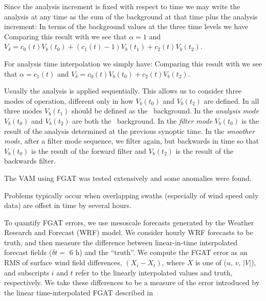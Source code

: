 \documentclass[12pt,titlepage]{article}
\begin{document}

Since the analysis increment is fixed with respect to time we may
write the analysis at any time as the sum of the background at that
time plus the analysis increment:
In terms of the background values at the three time levels we have
Comparing this result with  we see that $\alpha = 1$ and
$V_{\delta} = c_0(t) V_b(t_0) + (c_1(t) - 1) V_b(t_1) + c_2(t)
V_b(t_2)$.


For analysis time interpolation we simply have:
Comparing this result with  we see that $\alpha = c_1(t)$
and $V_{\delta} = c_0(t) V_b(t_0) + c_2(t) V_b(t_2)$.


Usually the analysis is applied sequentially.
This allows us to consider three modes of operation, different only
in how $V_b(t_0)$ and $V_b(t_2)$ are defined.
In all three modes $V_b(t_1)$ should be defined as the \apriori\
background.
In the \emph{analysis mode} $V_b(t_0)$ and $V_b(t_2)$ are both the
\apriori\ background.
In the \emph{filter mode} $V_b(t_0)$ is the result of the analysis
determined at the previous synoptic time.
In the \emph{smoother mode}, after a filter mode sequence, we filter
again, but backwards in time so that $V_b(t_0)$ is the result of the
forward filter and $V_b(t_2)$ is the result of the backwards filter.


The VAM using FGAT was tested extensively and some anomalies were
found.

Problems typically occur when overlapping swaths (especially of wind
speed only data) are offset in time by several hours.


To quantify FGAT errors, we use mesoscale forecasts generated by the
Weather Research and Forecast (WRF) model.
 We consider hourly WRF forecasts to be truth, and then measure
the difference between linear-in-time interpolated forecast fields
($\delta t =$ 6 h) and the ``truth''.
 We compute the FGAT error as an RMS of surface wind field
differences, $(X_i - X_t)$, where $X$ is one of ($u$, $v$, $|V|$),
and subscripts $i$ and $t$ refer to the linearly interpolated 
values and truth, respectively.
 We take these differences to be a measure of the error introduced by
the linear time-interpolated FGAT described in \secr{FGAT}
\end{document}

